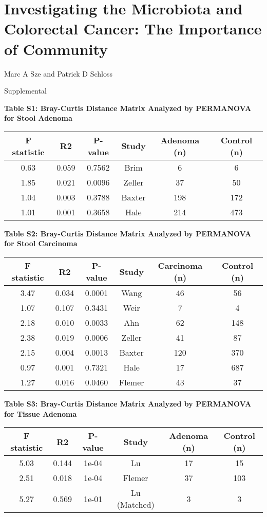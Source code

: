 \documentclass[12pt,]{article}
\title{}
\author{}
\date{}
\begin{document}
\section{Investigating the Microbiota and Colorectal Cancer: The
Importance of
Community}\label{investigating-the-microbiota-and-colorectal-cancer-the-importance-of-community}

\vspace{10mm}

\begin{center}
Marc A Sze and Patrick D Schloss

\vspace{10mm}

Supplemental
\end{center}

\newpage

\textbf{Table S1: Bray-Curtis Distance Matrix Analyzed by PERMANOVA for
Stool Adenoma}

\begin{longtable}[]{@{}cccccc@{}}
\toprule
F statistic & R2 & P-value & Study & Adenoma (n) & Control
(n)\tabularnewline
\midrule
\endhead
0.63 & 0.059 & 0.7562 & Brim & 6 & 6\tabularnewline
1.85 & 0.021 & 0.0096 & Zeller & 37 & 50\tabularnewline
1.04 & 0.003 & 0.3788 & Baxter & 198 & 172\tabularnewline
1.01 & 0.001 & 0.3658 & Hale & 214 & 473\tabularnewline
\bottomrule
\end{longtable}

\newpage

\textbf{Table S2: Bray-Curtis Distance Matrix Analyzed by PERMANOVA for
Stool Carcinoma}

\begin{longtable}[]{@{}cccccc@{}}
\toprule
F statistic & R2 & P-value & Study & Carcinoma (n) & Control
(n)\tabularnewline
\midrule
\endhead
3.47 & 0.034 & 0.0001 & Wang & 46 & 56\tabularnewline
1.07 & 0.107 & 0.3431 & Weir & 7 & 4\tabularnewline
2.18 & 0.010 & 0.0033 & Ahn & 62 & 148\tabularnewline
2.38 & 0.019 & 0.0006 & Zeller & 41 & 87\tabularnewline
2.15 & 0.004 & 0.0013 & Baxter & 120 & 370\tabularnewline
0.97 & 0.001 & 0.7321 & Hale & 17 & 687\tabularnewline
1.27 & 0.016 & 0.0460 & Flemer & 43 & 37\tabularnewline
\bottomrule
\end{longtable}

\newpage

\textbf{Table S3: Bray-Curtis Distance Matrix Analyzed by PERMANOVA for
Tissue Adenoma}

\begin{longtable}[]{@{}cccccc@{}}
\toprule
F statistic & R2 & P-value & Study & Adenoma (n) & Control
(n)\tabularnewline
\midrule
\endhead
5.03 & 0.144 & 1e-04 & Lu & 17 & 15\tabularnewline
2.51 & 0.018 & 1e-04 & Flemer & 37 & 103\tabularnewline
5.27 & 0.569 & 1e-01 & Lu (Matched) & 3 & 3\tabularnewline
\bottomrule
\end{longtable}
\end{document}
